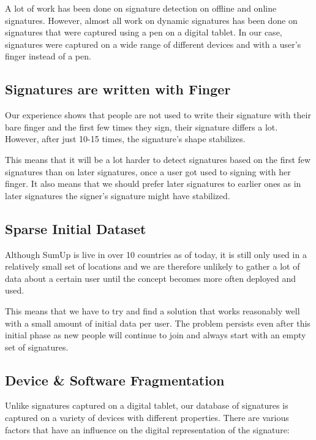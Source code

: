 \documentclass[a4paper, oneside]{csthesis}
\begin{document}
A lot of work has been done on signature detection on offline and online signatures. However, almost all work on dynamic signatures has been done on signatures that were captured using a pen on a digital tablet. In our case, signatures were captured on a wide range of different devices and with a user's finger instead of a pen.


\subsection{Signatures are written with Finger}

Our experience shows that people are not used to write their signature with their bare finger and the first few times they sign, their signature differs a lot. However, after just 10-15 times, the signature's shape stabilizes.

This means that it will be a lot harder to detect signatures based on the first few signatures than on later signatures, once a user got used to signing with her finger.
It also means that we should prefer later signatures to earlier ones as in later signatures the signer's signature might have stabilized.


\subsection{Sparse Initial Dataset}

Although SumUp is live in over 10 countries as of today, it is still only used in a relatively small set of locations and we are therefore unlikely to gather a lot of data about a certain user until the concept becomes more often deployed and used.

This means that we have to try and find a solution that works reasonably well with a small amount of initial data per user. The problem persists even after this initial phase as new people will continue to join and always start with an empty set of signatures.


\subsection{Device \& Software Fragmentation}

Unlike signatures captured on a digital tablet, our database of signatures is captured on a variety of devices with different properties. There are various factors that have an influence on the digital representation of the signature:
\end{document}

